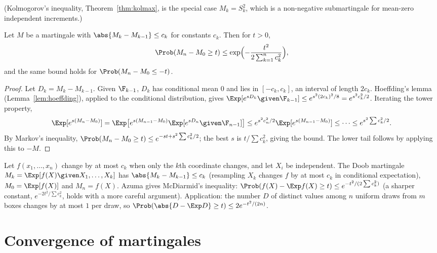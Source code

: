 (Kolmogorov's inequality, Theorem~\ref{thm:kolmax}, is the special case $M_k=S_k^2$, which is
a non-negative submartingale for mean-zero independent increments.)

\begin{theorem}\label{thm:azuma}
Let $M$ be a martingale with $\abs{M_k-M_{k-1}}\le c_k$ for constants $c_k$. Then for
$t>0$,
\[
\Prob(M_n-M_0\ge t)\le\exp\Bigl(-\frac{t^2}{2\sum_{k=1}^nc_k^2}\Bigr),
\]
and the same bound holds for $\Prob(M_n-M_0\le-t)$.
\end{theorem}
\begin{proof}
Let $D_k=M_k-M_{k-1}$. Given $\F_{k-1}$, $D_k$ has conditional mean $0$ and lies in
$[-c_k,c_k]$, an interval of length $2c_k$. Hoeffding's lemma
(Lemma~\ref{lem:hoeffding}), applied to the conditional distribution, gives
$\Exp[e^{sD_k}\given\F_{k-1}]\le e^{s^2(2c_k)^2/8}=e^{s^2c_k^2/2}$. Iterating the tower
property,
\[
\Exp[e^{s(M_n-M_0)}]=\Exp\bigl[e^{s(M_{n-1}-M_0)}\Exp[e^{sD_n}\given\F_{n-1}]\bigr]
\le e^{s^2c_n^2/2}\Exp[e^{s(M_{n-1}-M_0)}]\le\dots\le e^{s^2\sum c_k^2/2}.
\]
By Markov's inequality, $\Prob(M_n-M_0\ge t)\le e^{-st+s^2\sum c_k^2/2}$; the best $s$ is
$t/\sum c_k^2$, giving the bound. The lower tail follows by applying this to $-M$.
\end{proof}

\begin{example}
Let $f(x_1,\dots,x_n)$ change by at most $c_k$ when only the $k$th coordinate changes, and let
$X_i$ be independent. The Doob martingale $M_k=\Exp[f(X)\given X_1,\dots,X_k]$ has
$\abs{M_k-M_{k-1}}\le c_k$ (resampling $X_k$ changes $f$ by at most $c_k$ in conditional
expectation), $M_0=\Exp[f(X)]$ and $M_n=f(X)$. Azuma gives McDiarmid's inequality:
$\Prob(f(X)-\Exp f(X)\ge t)\le e^{-t^2/(2\sum c_k^2)}$ (a sharper constant, $e^{-2t^2/\sum c_k^2}$,
holds with a more careful argument). Application: the number $D$ of distinct values among $n$
uniform draws from $m$ boxes changes by at most $1$ per draw, so
$\Prob(\abs{D-\Exp D}\ge t)\le2e^{-t^2/(2n)}$.
\end{example}

\section{Convergence of martingales}

